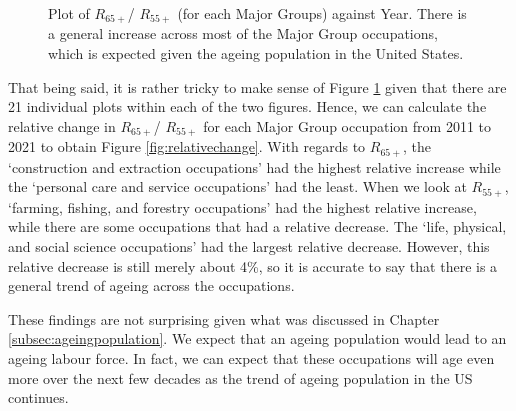 \documentclass[11pt]{article}
\begin{document}
 \begin{figure}
    \ContinuedFloat
    \centering
	\hfill
	\caption{Plot of $R_{65+}$/ $R_{55+}$ (for each Major Groups) against Year. There is a general increase across most of the Major Group occupations, which is expected given the ageing population in the United States.}
	\label{fig:EP/OP against year}
\end{figure}

That being said, it is rather tricky to make sense of Figure \ref{fig:EP/OP against year} given that there are 21 individual plots within each of the two figures. Hence, we can calculate the relative change in $R_{65+}$/ $R_{55+}$ for each Major Group occupation from 2011 to 2021 to obtain Figure \ref{fig:relativechange}. With regards to $R_{65+}$, the `construction and extraction occupations' had the highest relative increase while the `personal care and service occupations' had the least. When we look at  $R_{55+}$, `farming, fishing, and forestry occupations' had the highest relative increase, while there are some occupations that had a relative decrease. The `life, physical, and social science occupations' had the largest relative decrease. However, this relative decrease is still merely about 4\%, so it is accurate to say that there is a general trend of ageing across the occupations.

These findings are not surprising given what was discussed in Chapter \ref{subsec:ageingpopulation}. We expect that an ageing population would lead to an ageing labour force. In fact, we can expect that these occupations will age even more over the next few decades as the trend of ageing population in the US continues.
\end{document}
